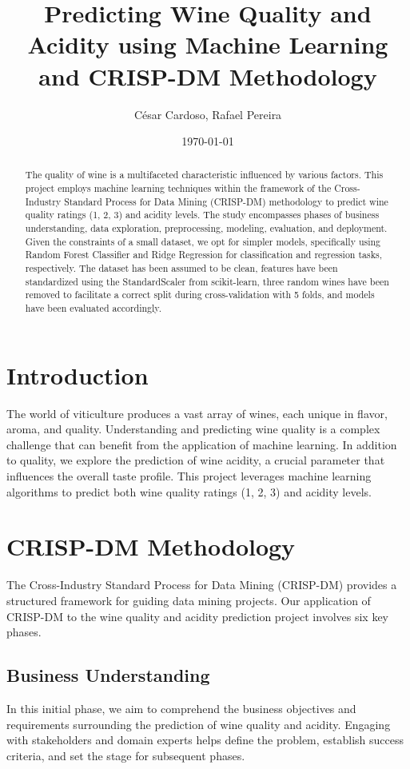 \documentclass[twocolumn]{article}
\title{Predicting Wine Quality and Acidity using Machine Learning and CRISP-DM
Methodology}
\author{César Cardoso, Rafael Pereira}
\date{\today}
\begin{document}
	\maketitle

	\begin{abstract}
		The quality of wine is a multifaceted characteristic influenced by various factors.
		This project employs machine learning techniques within the framework of the
		Cross-Industry Standard Process for Data Mining (CRISP-DM) methodology to
		predict wine quality ratings (1, 2, 3) and acidity levels. The study encompasses
		phases of business understanding, data exploration, preprocessing, modeling,
		evaluation, and deployment. Given the constraints of a small dataset, we opt
		for simpler models, specifically using Random Forest Classifier and Ridge Regression
		for classification and regression tasks, respectively. The dataset has been assumed
		to be clean, features have been standardized using the StandardScaler from
		scikit-learn, three random wines have been removed to facilitate a correct split
		during cross-validation with 5 folds, and models have been evaluated
		accordingly.
	\end{abstract}

	\section{Introduction}
	The world of viticulture produces a vast array of wines, each unique in flavor,
	aroma, and quality. Understanding and predicting wine quality is a complex challenge
	that can benefit from the application of machine learning. In addition to
	quality, we explore the prediction of wine acidity, a crucial parameter that
	influences the overall taste profile. This project leverages machine learning algorithms
	to predict both wine quality ratings (1, 2, 3) and acidity levels.

	\section{CRISP-DM Methodology}
	The Cross-Industry Standard Process for Data Mining (CRISP-DM) provides a structured
	framework for guiding data mining projects. Our application of CRISP-DM to the
	wine quality and acidity prediction project involves six key phases.

	\subsection{Business Understanding}
	In this initial phase, we aim to comprehend the business objectives and requirements
	surrounding the prediction of wine quality and acidity. Engaging with
	stakeholders and domain experts helps define the problem, establish success criteria,
	and set the stage for subsequent phases.
\end{document}
